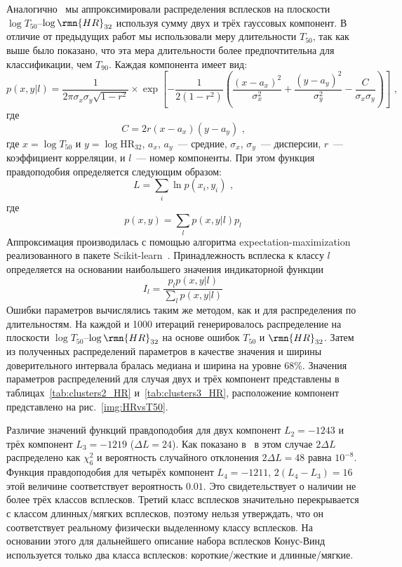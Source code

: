Аналогично~\citep{Horvath_2006} мы аппроксимировали распределения всплесков на 
плоскости $\log T_{50}$--$\log \rmn{HR}_{32}$ используя сумму двух и трёх 
гауссовых компонент. В отличие от предыдущих работ мы использовали меру длительности 
$T_{50}$, так как выше было показано, что эта мера длительности более предпочтительна 
для классификации, чем $T_{90}$. Каждая компонента имеет вид: 
\begin{equation}
p(x,y| l) = \frac{1}{2\pi \sigma_x \sigma_y \sqrt{1-r^2}} \times 
\exp\left[ -\frac{1}{2(1-r^2)}\left( \frac{(x-a_x)^2}{\sigma_x^2} + 
\frac{(y-a_y)^2}{\sigma_y^2} -\frac{C}{\sigma_x \sigma_y}\right)\right]\mbox{ ,}
\end{equation}
где
\begin{equation}
C = 2r(x-a_x)(y-a_y)\mbox{ ,} \nonumber
\end{equation}
где $x=\log T_{50}$ и $y=\log \mbox{HR}_{32}$,  $a_x$, $a_y$~--- средние, 
$\sigma_x$, $\sigma_y$~--- дисперсии, $r$~--- коэффициент корреляции, 
и $l$~--- номер компоненты. При этом функция правдоподобия определяется следующим образом:
\begin{equation}
L = \sum_i \ln p(x_i, y_i)\mbox{ ,}
\end{equation}
где
\begin{equation}
p(x,y) = \sum_l  p(x, y|l)p_l \nonumber
\end{equation}
Аппроксимация производилась с помощью алгоритма 
expectation-maximization~\citep{Horvath_2006, Balazs_2003AA} реализованного в пакете 
Scikit-learn~\citep{scikit-learn}.  Принадлежность всплеска к классу $l$ определяется 
на основании наибольшего значения индикаторной функции
\begin{equation}
I_l =\frac{p_l p(x,y|l)}{\sum_l  p(x, y|l)}
\end{equation}
Ошибки параметров вычислялись таким же методом, как и для распределения по длительностям. 
На каждой и 1000 итераций генерировалось распределение на плоскости  
$\log T_{50}$--$\log\rmn{HR}_{32}$ на основе ошибок $T_{50}$ и $\rmn{HR}_{32}$. 
Затем из полученных распределений параметров в качестве значения и ширины доверительного 
интервала бралась медиана и ширина на уровне 68\%. Значения параметров распределений 
для случая двух и трёх компонент представлены в таблицах~\ref{tab:clusters2_HR} 
и~\ref{tab:clusters3_HR}, расположение компонент представлено на рис.~\ref{img:HRvsT50}. 

Различие значений функций правдоподобия для двух компонент $L_2 = -1243$ и трёх 
компонент $L_3 = -1219$ ($\Delta L = 24$). Как показано в~\citep{Horvath_2006} 
в этом случае $2\Delta L$ распределено как $\chi^2_6$ и вероятность случайного 
отклонения $2\Delta L = 48$ равна $10^{-8}$. Функция правдоподобия для четырёх 
компонент $L_4 = -1211$, $2(L_4 - L_3) = 16$ этой величине соответствует вероятность $0.01$. 
Это свидетельствует о наличии не более трёх классов всплесков. Третий класс всплесков 
значительно перекрывается с классом длинных/мягких всплесков, поэтому нельзя утверждать, 
что он соответствует реальному физически выделенному классу всплесков. На основании 
этого для дальнейшего описание набора всплесков Конус-Винд используется только 
два класса всплесков: короткие/жесткие и длинные/мягкие.

